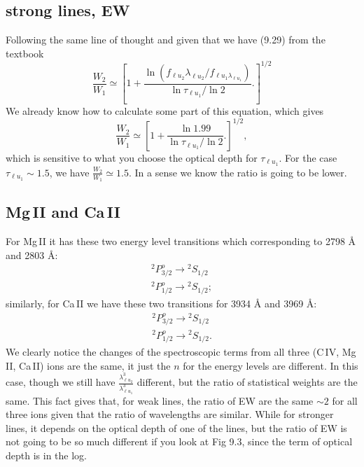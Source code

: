 \documentclass[12pt,letterpaper]{article}
\newcommand{\civ}{\textrm{C\,IV}}
\newcommand{\mgii}{\textrm{Mg\,II}}
\newcommand{\caii}{\textrm{Ca\,II}}
\begin{document}
\subsection{strong lines, EW}
Following the same line of thought and given that we have (9.29) from the textbook
\begin{equation*}
    \frac{W_2}{W_1} \simeq 
    \left[
        1 + \frac{\ln{(f_{\ell u_2} \lambda_{\ell u_2}/f_{\ell u_1 \lambda_{\ell u_1}})}}{\ln{\tau_{\ell u_1}/\ln{2}}}.
    \right]^{1/2}
\end{equation*}
We already know how to calculate some part of this equation, which gives
\begin{equation*}
    \frac{W_2}{W_1} \simeq 
    \left[
        1 + \frac{\ln{1.99}}{\ln{\tau_{\ell u_1}/\ln{2}}}.
    \right]^{1/2},
\end{equation*}
which is sensitive to what you choose the optical depth for $\tau_{\ell u_1}$. 
For the case $\tau_{\ell u_1} \sim 1.5$, we have $\frac{W_2}{W_1} \simeq 1.5$. 
In a sense we know the ratio is going to be lower.

\subsection{{\mgii} and \caii}
For {\mgii} it has these two energy level transitions which corresponding to 2798 {\AA} and 2803 {\AA}:
\begin{equation*}
    \begin{split}
        {^2}P^o_{3/2} \rightarrow {^2}S_{1/2}\\
        {^2}P^o_{1/2} \rightarrow {^2}S_{1/2};
    \end{split}
\end{equation*}
similarly, for {\caii} we have these two transitions for 3934 {\AA} and 3969 {\AA}:
\begin{equation*}
    \begin{split}
        {^2}P^o_{3/2} \rightarrow {^2}S_{1/2}\\
        {^2}P^o_{1/2} \rightarrow {^2}S_{1/2}.
    \end{split}
\end{equation*}
We clearly notice the changes of the spectroscopic terms from all three ({\civ}, {\mgii}, {\caii}) ions are the same, it just the $n$ for the energy levels are different.
In this case, though we still have $\frac{\lambda_{\ell u_2}^3}{\lambda_{\ell u_1}^3}$ different, but the ratio of statistical weights are the same.
This fact gives that, for weak lines, the ratio of EW are the same $\sim 2$ for all three ions given that the ratio of wavelengths are similar.
While for stronger lines, it depends on the optical depth of one of the lines, but the ratio of EW is not going to be so much different if you look at Fig 9.3, since the term of optical depth is in the log.
\end{document}
